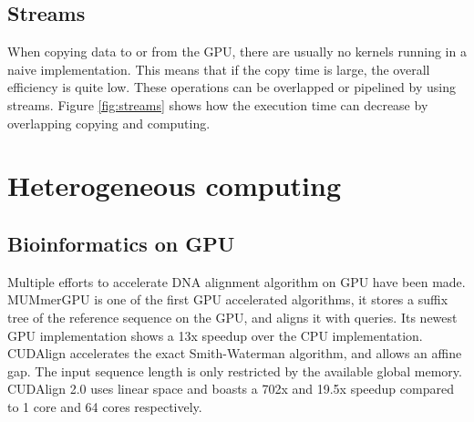 \documentclass[../main/thesis.tex]{subfiles}
\begin{document}


\subsection{Streams}
When copying data to or from the GPU, there are usually no kernels running in a naive implementation.
This means that if the copy time is large, the overall efficiency is quite low.
These operations can be overlapped or pipelined by using streams. Figure \ref{fig:streams} shows how the execution time can decrease by overlapping copying and computing.






\section{Heterogeneous computing}


\subsection{Bioinformatics on GPU}


Multiple efforts to accelerate DNA alignment algorithm on GPU have been made.
MUMmerGPU \cite{MUMmerGPU}\cite{MUMmerGPU2} is one of the first GPU accelerated algorithms, it stores a suffix tree of the reference sequence on the GPU, and aligns it with queries.
Its newest GPU implementation shows a 13x speedup over the CPU implementation.
CUDAlign \cite{CUDAlign} accelerates the exact Smith-Waterman algorithm, and allows an affine gap.
The input sequence length is only restricted by the available global memory.
CUDAlign 2.0 \cite{CUDAlign2} uses linear space and boasts a 702x and 19.5x speedup compared to 1 core and 64 cores respectively.
\end{document}
